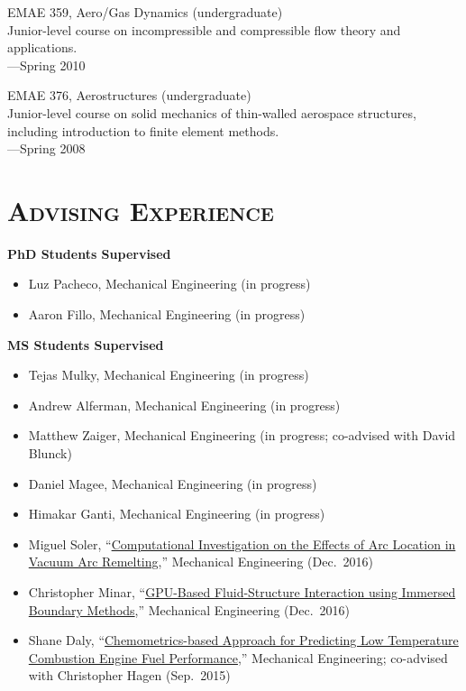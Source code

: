\documentclass[margin,line,11pt]{res}
\begin{document}
\begin{resume}
EMAE 359, Aero\slash Gas Dynamics (undergraduate) \\
Junior-level course on incompressible and compressible flow theory and applications. \\
---Spring 2010

EMAE 376, Aerostructures (undergraduate) \\
Junior-level course on solid mechanics of thin-walled aerospace structures, including introduction to finite element methods. \\
---Spring 2008

\section{\textsc{Advising Experience}}

\textbf{PhD Students Supervised}
\begin{itemize}[leftmargin=*]
    \item Luz Pacheco, Mechanical Engineering (in progress)
    \item Aaron Fillo, Mechanical Engineering (in progress)
\end{itemize}

\textbf{MS Students Supervised}
\begin{itemize}[leftmargin=*]
    \item Tejas Mulky, Mechanical Engineering (in progress)
    \item Andrew Alferman, Mechanical Engineering (in progress)
    \item Matthew Zaiger, Mechanical Engineering (in progress; co-advised with David Blunck)
    \item Daniel Magee, Mechanical Engineering (in progress)
    \item Himakar Ganti, Mechanical Engineering (in progress)
    \item Miguel Soler, ``\href{http://hdl.handle.net/1957/60070}{Computational Investigation on the Effects of Arc Location in Vacuum Arc Remelting},'' Mechanical Engineering (Dec.\ 2016)
    \item Christopher Minar, ``\href{http://hdl.handle.net/1957/60147}{GPU-Based Fluid-Structure Interaction using Immersed Boundary Methods},'' Mechanical Engineering (Dec.\ 2016)
    \item Shane Daly, ``\href{http://hdl.handle.net/1957/57465}{Chemometrics-based Approach for Predicting Low Temperature Combustion Engine Fuel Performance},'' Mechanical Engineering; co-advised with Christopher Hagen (Sep.\ 2015)
\end{itemize}


\end{resume}
\end{document}

